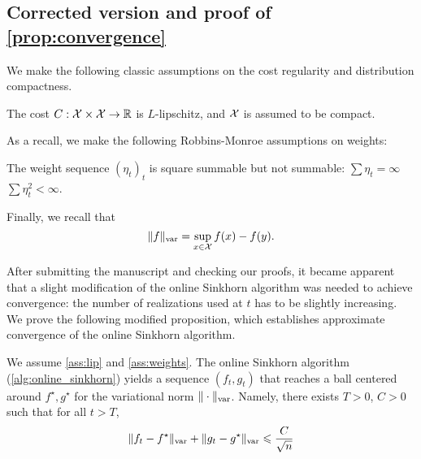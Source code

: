 \subsection{Corrected version and proof of \autoref{prop:convergence}}

\makeatletter
\newcommand{\setpropositiontag}[1]{%
  \let\oldtheproposition\theproposition%
  \renewcommand{\theproposition}{#1}%
  \g@addto@macro\endproposition{%
    \addtocounter{proposition}{-1}%
    \global\let\theproposition\oldtheproposition}%
  }
\makeatother


We make the following classic assumptions on the cost regularity and distribution compactness.

\begin{assumption}\label{ass:lip}
    The cost $C: \mathcal{X} \times \mathcal{X} \to \mathbb{R}$ is $L$-lipschitz, and $\mathcal{X}$ is assumed to be compact.
\end{assumption}
As a recall, we make the following Robbins-Monroe assumptions on weights:
\begin{assumption}\label{ass:weights}
    The weight sequence ${(\eta_t)}_t$ is square summable but not summable: 
    $\sum \eta_t = \infty$ \qquad $\sum \eta_t^2 < \infty$.
\end{assumption}
Finally, we recall that
\begin{equation}
    \Vert f \Vert_{\text{var}} = \sup_{x \in \mathcal{X}} f(x) - f(y).
\end{equation}

After submitting the manuscript and checking our proofs, it became apparent that a slight modification of the online Sinkhorn algorithm was needed to achieve convergence: the number of realizations used at $t$ has to be slightly increasing. We prove the following modified proposition, which establishes approximate convergence of the online Sinkhorn algorithm.

\setpropositiontag{4 bis}
\begin{proposition}\label{prop:convergence_bis}
    We assume \autoref{ass:lip} and \ref{ass:weights}. The online Sinkhorn algorithm (\autoref{alg:online_sinkhorn}) yields a sequence $(f_t, g_t)$ that reaches a
    ball centered around $f^\star, g^\star$ for the variational norm $\Vert
    \cdot \Vert_{\text{var}}$. Namely, there exists $T > 0$, $C > 0$ such that for all $t > T$,
    \begin{equation}
        \Vert f_t - f^\star \Vert_{\text{var}}
        + \Vert g_t - g^\star \Vert_{\text{var}} \leqslant \frac{C}{\sqrt{n}} 
    \end{equation}
\end{proposition}

